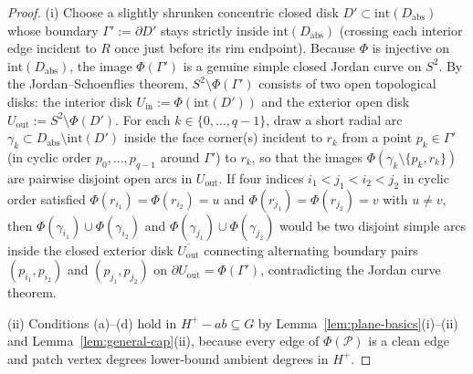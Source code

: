 \documentclass[11pt,reqno]{amsart}
\theoremstyle{plain}
\theoremstyle{definition}
\theoremstyle{remark}
\DeclareRobustCommand{\_}{\ifmmode\text{\textunderscore}\else\textunderscore\allowbreak\fi}
\begin{document}
\begin{proof}
(i) Choose a slightly shrunken concentric closed disk $D' \subset \mathrm{int}(D_{\mathrm{abs}})$ whose boundary $\Gamma' := \partial D'$ stays strictly inside $\mathrm{int}(D_{\mathrm{abs}})$ (crossing each interior edge incident to $R$ once just before its rim endpoint). Because $\Phi$ is injective on $\mathrm{int}(D_{\mathrm{abs}})$, the image $\Phi(\Gamma')$ is a genuine simple closed Jordan curve on $S^2$. By the Jordan--Schoenflies theorem, $S^2 \setminus \Phi(\Gamma')$ consists of two open topological disks: the interior disk $U_{\mathrm{in}} := \Phi(\mathrm{int}(D'))$ and the exterior open disk $U_{\mathrm{out}} := S^2 \setminus \Phi(D')$. For each $k \in \{0, \dots, q-1\}$, draw a short radial arc $\gamma_k \subset D_{\mathrm{abs}} \setminus \mathrm{int}(D')$ inside the face corner(s) incident to $r_k$ from a point $p_k \in \Gamma'$ (in cyclic order $p_0, \dots, p_{q-1}$ around $\Gamma'$) to $r_k$, so that the images $\Phi(\gamma_k \setminus \{p_k, r_k\})$ are pairwise disjoint open arcs in $U_{\mathrm{out}}$. If four indices $i_1 < j_1 < i_2 < j_2$ in cyclic order satisfied $\Phi(r_{i_1}) = \Phi(r_{i_2}) = u$ and $\Phi(r_{j_1}) = \Phi(r_{j_2}) = v$ with $u \neq v$, then $\Phi(\gamma_{i_1}) \cup \Phi(\gamma_{i_2})$ and $\Phi(\gamma_{j_1}) \cup \Phi(\gamma_{j_2})$ would be two disjoint simple arcs inside the closed exterior disk $\overline{U_{\mathrm{out}}}$ connecting alternating boundary pairs $(p_{i_1}, p_{i_2})$ and $(p_{j_1}, p_{j_2})$ on $\partial U_{\mathrm{out}} = \Phi(\Gamma')$, contradicting the Jordan curve theorem.

(ii) Conditions (a)--(d) hold in $H^+ - ab \subseteq G$ by Lemma~\ref{lem:plane-basics}(i)--(ii) and Lemma~\ref{lem:general-cap}(ii), because every edge of $\Phi(\mathcal{P})$ is a clean edge and patch vertex degrees lower-bound ambient degrees in $H^+$.


\end{proof}
\end{document}
